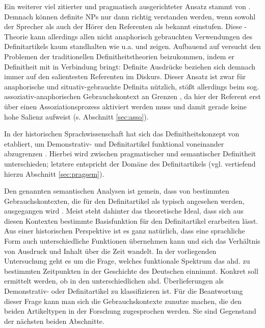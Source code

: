 Ein weiterer viel zitierter und pragmatisch ausgerichteter Ansatz stammt von \textcite{Christophersen1939}. Demnach können definite NPs nur dann richtig verstanden werden, wenn sowohl der Sprecher als auch der Hörer den Referenten als bekannt einstufen. Diese -Theorie kann allerdings allen nicht anaphorisch gebrauchten Verwendungen des Definitartikels kaum standhalten wie u.a. \textcite{Hawkins1978} und \textcite{Lobner1985} zeigen. Aufbauend auf \textcite{Lewis1970} versucht \textcite{vonHeusinger1996} den Problemen der traditionellen Definitheitstheorien beizukommen, indem er Definitheit mit  in Verbindung bringt: Definite Ausdrücke beziehen sich demnach immer auf den salientesten Referenten im Diskurs. Dieser Ansatz ist zwar für anaphorische und situativ-gebrauchte Definita nützlich, stößt allerdings beim sog. assoziativ-anaphorischen Gebrauchskontext an Grenzen \parencite[s. auch][144--149]{Cui2014}, da hier der Referent erst über einen Assoziationsprozess aktiviert werden muss und damit gerade keine hohe Salienz aufweist (s. Abschnitt \ref{sec:asso}).

In der historischen Sprachwissenschaft hat sich das Definitheitskonzept von \textcite{Lobner1985} etabliert, um Demonstrativ- und Definitartikel funktional voneinander abzugrenzen \parencite{Demske2001,Szczepaniak2011a,Schlachter2015}. Hierbei wird zwischen pragmatischer und semantischer Definitheit unterschieden; letztere entspricht der Domäne des Definitartikels (vgl. vertiefend hierzu Abschnitt \ref{sec:pragsem}). 

Den genannten  semantischen Analysen ist gemein, dass von bestimmten Gebrauchskontexten, die für den Definitartikel als typisch angesehen werden, ausgegangen wird \parencite[9]{Cui2014}. Meist steht dahinter das theoretische Ideal, dass sich aus diesen Kontexten  bestimmte Basisfunktion für den Definitartikel erarbeiten lässt. Aus einer historischen Perspektive ist es ganz natürlich, dass eine sprachliche Form auch unterschiedliche Funktionen übernehmen kann und sich das Verhältnis von Ausdruck und Inhalt über die Zeit wandelt. In der vorliegenden Untersuchung geht es um die Frage, welches funktionale Spektrum das ahd.  zu bestimmten Zeitpunkten in der Geschichte des Deutschen einnimmt. Konkret soll ermittelt werden, ob  in den unterschiedlichen ahd. Überlieferungen als Demonstrativ- oder Definitartikel zu klassifizieren ist. Für die Beantwortung dieser Frage kann man sich die Gebrauchskontexte zunutze machen, die den beiden Artikeltypen in der Forschung zugesprochen werden. Sie sind Gegenstand der nächsten beiden Abschnitte. 


